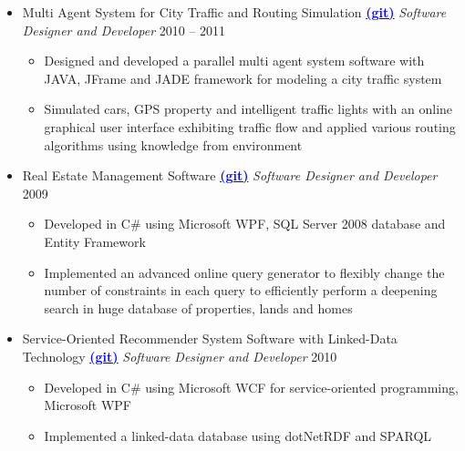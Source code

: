 \documentclass[letter]{res}
\begin{document}
\begin{resume}
\begin{itemize}[leftmargin=-.1in]
			\item Multi Agent System for City Traffic and Routing Simulation {\href{https://github.com/omid55/city_routing_model_jade_mutli_agent_system}{\textbf{\textcolor{blue}{(git)}}}} \newline
			{\sl Software Designer and Developer} \hfill 2010 – 2011\\
			\vspace{-4mm}
			\iflong
			\begin{itemize}
				\item Designed and developed a parallel multi agent system software with JAVA, JFrame and JADE framework for modeling a city traffic system
				\item Simulated cars, GPS property and intelligent traffic lights with an online graphical user interface exhibiting traffic flow and applied various routing algorithms using knowledge from environment
			\end{itemize}
			\fi
			
			\item Real Estate Management Software {\href{https://github.com/omid55/real_state_manager}{\textbf{\textcolor{blue}{(git)}}}}
			\newline
			{\sl Software Designer and Developer} \hfill 2009\\
			\vspace{-4mm}
			\iflong
			\begin{itemize}
				\item Developed in C\# using Microsoft WPF, SQL Server 2008 database and Entity Framework
				\item Implemented an advanced online query generator to flexibly change the number of constraints in each query to efficiently perform a deepening search in huge database of properties, lands and homes
			\end{itemize}
			\fi
			
			\item Service-Oriented Recommender System Software with Linked-Data Technology {\href{https://github.com/omid55/service_oriented_linked_data_based_recommender_system}{\textbf{\textcolor{blue}{(git)}}}}
			\newline
			{\sl Software Designer and Developer} \hfill 2010\\
			\vspace{-4mm}
			\iflong
			\begin{itemize}
				\item Developed in C\# using Microsoft WCF for service-oriented programming, Microsoft WPF
				\item Implemented a linked-data database using dotNetRDF and SPARQL
			\end{itemize}
			\fi
			

\end{itemize}
\end{resume}
\end{document}
